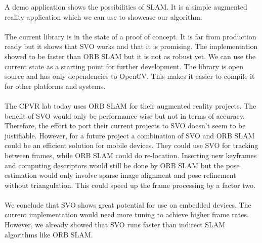 \documentclass[11pt,a4paper,titlepage,oneside]{report}
\begin{document}
A demo application shows the possibilities of SLAM. It is a simple augmented reality application which we can use to showcase our algorithm.\\\\
The current library is in the state of a proof of concept. It is far from production ready but it shows that SVO works and that it is promising. The implementation showed to be faster than ORB SLAM but it is not as robust yet. We can use the current state as a starting point for further development. The library is open source and has only dependencies to OpenCV. This makes it easier to compile it for other platforms and systems.\\\\
The CPVR lab today uses ORB SLAM for their augmented reality projects. The benefit of SVO would only be performance wise but not in terms of accuracy. Therefore, the effort to port their current projects to SVO doesn't seem to be justifiable. However, for a future project a combination of SVO and ORB SLAM could be an efficient solution for mobile devices. They could use SVO for tracking between frames, while ORB SLAM could do re-location. Inserting new keyframes and computing descriptors would still be done by ORB SLAM but the pose estimation would only involve sparse image alignment and pose refinement without triangulation. This could speed up the frame processing by a factor two.\\\\
We conclude that SVO shows great potential for use on embedded devices. The current implementation would need more tuning to achieve higher frame rates. However, we already showed that SVO runs faster than indirect SLAM algorithms like ORB SLAM.

\printbibliography
\end{document}

